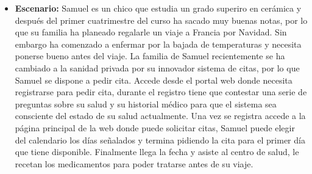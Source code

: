 \begin{itemize}
    \item \textbf{Escenario: } Samuel es un chico que estudia un grado superiro en cerámica y después del primer
    cuatrimestre del curso ha sacado muy buenas notas, por lo que su familia ha planeado
    regalarle un viaje a Francia por Navidad. Sin embargo ha comenzado a enfermar por la bajada
    de temperaturas y necesita ponerse bueno antes del viaje. La familia de Samuel recientemente
    se ha cambiado a la sanidad privada por su innovador sistema de citas, por lo que Samuel se
    dispone a pedir cita. Accede desde el portal web donde necesita registrarse para pedir cita,
    durante el registro tiene que contestar una serie de preguntas sobre su salud y su historial
    médico para que el sistema sea consciente del estado de su salud actualmente.
    Una vez se registra accede a la página principal de la web donde puede solicitar citas, Samuel
    puede elegir del calendario los días señalados y termina pidiendo la cita para el primer día que
    tiene disponible. Finalmente llega la fecha y asiste al centro de salud, le recetan los
    medicamentos para poder tratarse antes de su viaje.
\end{itemize}
